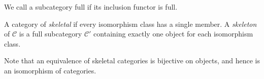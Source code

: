We call a subcategory full if its inclusion functor is full.
\begin{definition}
    A category of \emph{skeletal} if every isomorphism class has a single member.
    A \emph{skeleton} of \( \mathcal C \) is a full subcategory \( \mathcal C' \) containing exactly one object for each isomorphism class.
\end{definition}
Note that an equivalence of skeletal categories is bijective on objects, and hence is an isomorphism of categories.
